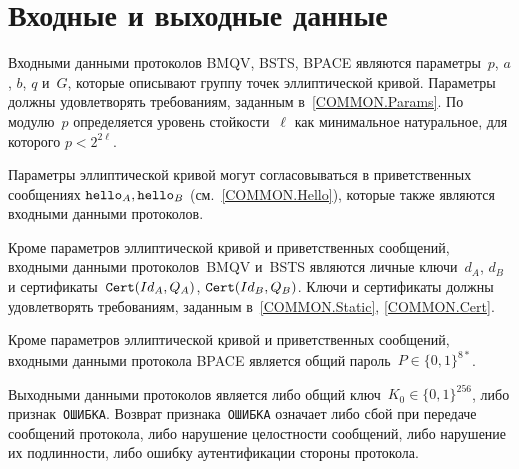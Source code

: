 \section{Входные и выходные данные}\label{INOUT}

Входными данными протоколов BMQV, BSTS, BPACE являются 
параметры~$p$, $a$, $b$, $q$ и~$G$, 
которые описывают группу точек эллиптической кривой. 
Параметры должны удовлетворять требованиям, заданным в~\ref{COMMON.Params}. 
По модулю~$p$ определяется уровень стойкости~$\ell$ как минимальное 
натуральное, для которого $p<2^{2\ell}$.

Параметры эллиптической кривой могут согласовываться в 
приветственных сообщениях $\texttt{hello}_A,\texttt{hello}_B$ (см.~\ref{COMMON.Hello}),
которые также являются входными данными протоколов.

Кроме параметров эллиптической кривой и приветственных сообщений, 
входными данными протоколов~BMQV и~BSTS являются личные ключи~$d_A$, $d_B$ 
и сертификаты~$\texttt{Cert}(Id_A,Q_A)$, $\texttt{Cert}(Id_B,Q_B)$.
Ключи и сертификаты должны удовлетворять требованиям, 
заданным в~\ref{COMMON.Static}, \ref{COMMON.Cert}.

Кроме параметров эллиптической кривой и приветственных сообщений, 
входными данными протокола BPACE является общий пароль~$P\in\{0,1\}^{8*}$.

Выходными данными протоколов является либо общий
ключ~$K_0\in\{0,1\}^{256}$, либо признак~\texttt{ОШИБКА}. 
Возврат признака~\texttt{ОШИБКА} означает 
либо сбой при передаче сообщений протокола,
либо нарушение целостности сообщений,
либо нарушение их подлинности,
либо ошибку аутентификации стороны протокола.




